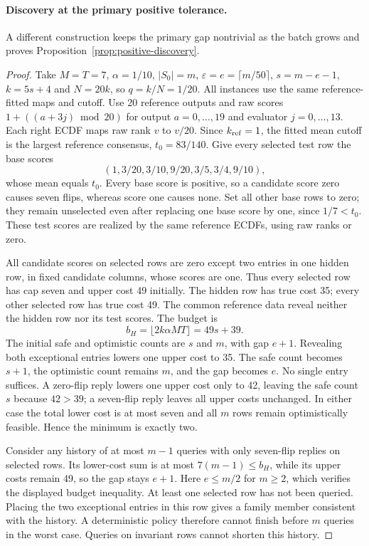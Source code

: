 \paragraph{Discovery at the primary positive tolerance.}
A different construction keeps the primary gap nontrivial as the batch grows and proves Proposition~\ref{prop:positive-discovery}.
\begin{proof}
Take $M=T=7$, $\alpha=1/10$, $|S_0|=m$, $\varepsilon=e=\lceil m/50\rceil$, $s=m-e-1$, $k=5s+4$ and $N=20k$, so $q=k/N=1/20$. All instances use the same reference-fitted maps and cutoff. Use 20 reference outputs and raw scores $1+((a+3j)\bmod20)$ for output $a=0,\ldots,19$ and evaluator $j=0,\ldots,13$. Each right ECDF maps raw rank $v$ to $v/20$. Since $k_{\rm ref}=1$, the fitted mean cutoff is the largest reference consensus, $t_0=83/140$. Give every selected test row the base scores
\[
 (1,3/20,3/10,9/20,3/5,3/4,9/10),
\]
whose mean equals $t_0$. Every base score is positive, so a candidate score zero causes seven flips, whereas score one causes none. Set all other base rows to zero; they remain unselected even after replacing one base score by one, since $1/7<t_0$. These test scores are realized by the same reference ECDFs, using raw ranks or zero.

All candidate scores on selected rows are zero except two entries in one hidden row, in fixed candidate columns, whose scores are one. Thus every selected row has cap seven and upper cost 49 initially. The hidden row has true cost 35; every other selected row has true cost 49. The common reference data reveal neither the hidden row nor its test scores. The budget is
\[
 b_H=\lfloor 2k\alpha MT\rfloor=49s+39.
\]
The initial safe and optimistic counts are $s$ and $m$, with gap $e+1$. Revealing both exceptional entries lowers one upper cost to 35. The safe count becomes $s+1$, the optimistic count remains $m$, and the gap becomes $e$. No single entry suffices. A zero-flip reply lowers one upper cost only to 42, leaving the safe count $s$ because $42>39$; a seven-flip reply leaves all upper costs unchanged. In either case the total lower cost is at most seven and all $m$ rows remain optimistically feasible. Hence the minimum is exactly two.

Consider any history of at most $m-1$ queries with only seven-flip replies on selected rows. Its lower-cost sum is at most $7(m-1)\le b_H$, while its upper costs remain 49, so the gap stays $e+1$. Here $e\le m/2$ for $m\ge2$, which verifies the displayed budget inequality. At least one selected row has not been queried. Placing the two exceptional entries in this row gives a family member consistent with the history. A deterministic policy therefore cannot finish before $m$ queries in the worst case. Queries on invariant rows cannot shorten this history.


\end{proof}
